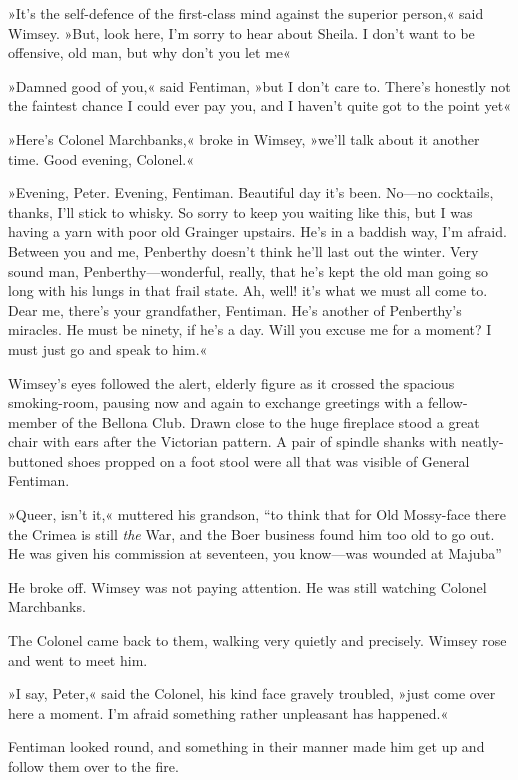 »It's the self-defence of the first-class mind against the superior person,« said Wimsey. »But, look here, I'm sorry to hear about Sheila. I don't want to be offensive, old man, but why don't you let me\longdash«

»Damned good of you,« said Fentiman, »but I don't care to. There's honestly not the faintest chance I could ever pay you, and I haven't quite got to the point yet\longdash«

»Here's Colonel Marchbanks,« broke in Wimsey, »we'll talk about it another time. Good evening, Colonel.«

»Evening, Peter. Evening, Fentiman. Beautiful day it's been. No\allowbreak---\allowbreak no cocktails, thanks, I'll stick to whisky. So sorry to keep you waiting like this, but I was having a yarn with poor old Grainger upstairs. He's in a baddish way, I'm afraid. Between you and me, Penberthy doesn't think he'll last out the winter. Very sound man, Penberthy\allowbreak---\allowbreak wonderful, really, that he's kept the old man going so long with his lungs in that frail state. Ah, well! it's what we must all come to. Dear me, there's your grandfather, Fentiman. He's another of Penberthy's miracles. He must be ninety, if he's a day. Will you excuse me for a moment? I must just go and speak to him.«

Wimsey's eyes followed the alert, elderly figure as it crossed the spacious smoking-room, pausing now and again to exchange greetings with a fellow-member of the Bellona Club. Drawn close to the huge fireplace stood a great chair with ears after the Victorian pattern. A pair of spindle shanks with neatly-buttoned shoes propped on a foot stool were all that was visible of General Fentiman.

»Queer, isn't it,« muttered his grandson, \enquote{to think that for Old Mossy-face there the Crimea is still \textit{the} War, and the Boer business found him too old to go out. He was given his commission at seventeen, you know\allowbreak---\allowbreak was wounded at Majuba\longdash}

He broke off. Wimsey was not paying attention. He was still watching Colonel Marchbanks.

The Colonel came back to them, walking very quietly and precisely. Wimsey rose and went to meet him.

»I say, Peter,« said the Colonel, his kind face gravely troubled, »just come over here a moment. I'm afraid something rather unpleasant has happened.«

Fentiman looked round, and something in their manner made him get up and follow them over to the fire.


